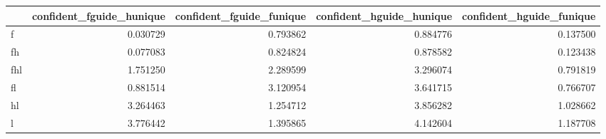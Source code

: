 \begin{tabular}{lrrrr}
\toprule
 & confident_fguide_hunique & confident_fguide_funique & confident_hguide_hunique & confident_hguide_funique \\
\midrule
f & 0.030729 & 0.793862 & 0.884776 & 0.137500 \\
fh & 0.077083 & 0.824824 & 0.878582 & 0.123438 \\
fhl & 1.751250 & 2.289599 & 3.296074 & 0.791819 \\
fl & 0.881514 & 3.120954 & 3.641715 & 0.766707 \\
hl & 3.264463 & 1.254712 & 3.856282 & 1.028662 \\
l & 3.776442 & 1.395865 & 4.142604 & 1.187708 \\
\bottomrule
\end{tabular}
